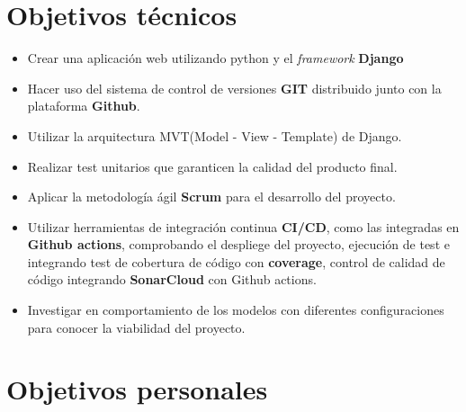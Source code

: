 \section{Objetivos técnicos}\label{objetivos_tecnicos}
\begin{itemize}
    \item Crear una aplicación web utilizando python y el \textit{framework} \textbf{Django}
    \item Hacer uso del sistema de control de versiones \textbf{GIT} distribuido junto con la plataforma \textbf{Github}.
    \item Utilizar la arquitectura MVT(Model - View - Template) de Django.
    \item Realizar test unitarios que garanticen la calidad del producto final.
    \item Aplicar la metodología ágil \textbf{Scrum} para el desarrollo del proyecto.
    \item Utilizar herramientas de integración continua \textbf{CI/CD}, como las integradas en \textbf{Github actions}, comprobando el despliege del proyecto, ejecución de test e integrando test de cobertura de código con \textbf{coverage}, control de calidad de código integrando \textbf{SonarCloud} con Github actions.
    \item Investigar en comportamiento de los modelos con diferentes configuraciones para conocer la viabilidad del proyecto.
\end{itemize}

\section{Objetivos personales}\label{objetivos_personasles}
